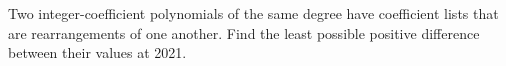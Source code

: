 Two integer-coefficient polynomials of the same degree have coefficient lists that are rearrangements of one another. Find the least possible positive difference between their values at 2021.
